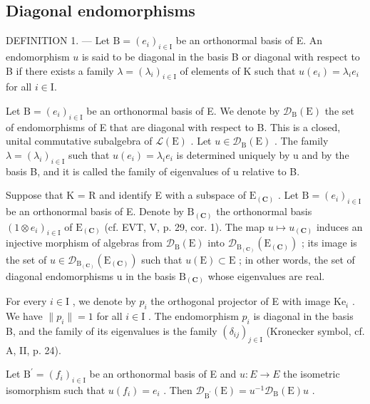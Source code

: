 \subsection{Diagonal endomorphisms}

DEFINITION 1. --- Let \(\mathrm{B} = (e_i)_{i \in \mathrm{I}}\) be an orthonormal basis of E. An endomorphism \(u\) is said to be diagonal in the basis B or diagonal with respect to B if there exists a family \(\lambda = (\lambda_i)_{i \in \mathrm{I}}\) of elements of K such that \(u(e_i) = \lambda_i e_i\) for all \(i \in \mathrm{I}\).

Let \(\mathrm{B} = (e_i)_{i \in \mathrm{I}}\) be an orthonormal basis of E. We denote by \(\mathcal{D}_{\mathrm{B}}(\mathrm{E})\) the set of endomorphisms of E that are diagonal with respect to B. This is a closed, unital commutative subalgebra of \(\mathcal{L}(\mathrm{E})\) . Let \(u \in \mathcal{D}_{\mathrm{B}}(\mathrm{E})\) . The family \(\lambda = (\lambda_i)_{i \in \mathrm{I}}\) such that \(u(e_i) = \lambda_i e_i\) is determined uniquely by u and by the basis B, and it is called the family of eigenvalues of u relative to B.

Suppose that K = R and identify E with a subspace of \(\mathrm{E}_{(\mathbf{C})}\) . Let \(\mathrm{B} = (e_i)_{i \in \mathrm{I}}\) be an orthonormal basis of E. Denote by \(\mathrm{B}_{(\mathbf{C})}\) the orthonormal basis \((1 \otimes e_i)_{i \in \mathrm{I}}\) of \(\mathrm{E}_{(\mathbf{C})}\) (cf. EVT, V, p. 29, cor. 1). The map \(u \mapsto u_{(\mathbf{C})}\) induces an injective morphism of algebras from \(\mathcal{D}_{\mathrm{B}}(\mathrm{E})\) into \(\mathcal{D}_{\mathrm{B}_{(\mathbf{C})}}(\mathrm{E}_{(\mathbf{C})})\) ; its image is the set of \(u \in \mathcal{D}_{\mathrm{B}_{(\mathbf{C})}}(\mathrm{E}_{(\mathbf{C})})\) such that \(u(\mathrm{E}) \subset \mathrm{E}\) ; in other words, the set of diagonal endomorphisms u in the basis \(\mathrm{B}_{(\mathbf{C})}\) whose eigenvalues are real.

For every \(i \in \mathrm{I}\) , we denote by \(p_i\) the orthogonal projector of E with image \(\mathrm{Ke}_i\) . We have \(\| p_i \| = 1\) for all \(i \in \mathrm{I}\) . The endomorphism \(p_i\) is diagonal in the basis B, and the family of its eigenvalues is the family \((\delta_{ij})_{j\in\mathrm{I}}\) (Kronecker symbol, cf. A, II, p. 24).

Let \(\mathrm{B}^{\prime}=(f_{i})_{i\in\mathrm{I}}\) be an orthonormal basis of E and \(u:E\to E\) the isometric isomorphism such that \(u(f_{i})=e_{i}\) . Then \(\mathcal{D}_{\mathrm{B}^{\prime}}(\mathrm{E})=u^{-1}\mathcal{D}_{\mathrm{B}}(\mathrm{E})u\) .

